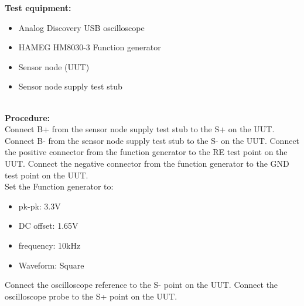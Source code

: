 \textbf{Test equipment:}
\begin{itemize}
	\item Analog Discovery USB oscilloscope
	\item HAMEG HM8030-3 Function generator
	\item Sensor node (UUT)
	\item Sensor node supply test stub
\end{itemize}
\ \\
\textbf{Procedure:}\\
Connect B+ from the sensor node supply test stub to the S+ on the UUT. Connect B- from the sensor node supply test stub to the S- on the UUT.
Connect the positive connector from the function generator to the RE test point on the UUT. Connect the negative connector from the function generator to the GND test point on the UUT.\\ Set the Function generator to:
\begin{itemize}
	\item pk-pk: 3.3V
	\item DC offset: 1.65V
	\item frequency: 10kHz
	\item Waveform: Square
\end{itemize}

Connect the oscilloscope reference to the S- point on the UUT.
Connect the oscilloscope probe to the S+ point on the UUT.


\begin{figure}[H]
	\centering
\end{figure}

